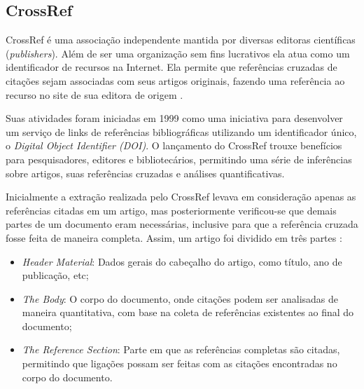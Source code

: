 

    

\subsection{CrossRef}
\label{ssec:crossref}

CrossRef é uma associação independente mantida por diversas editoras científicas (\emph{publishers}). Além de ser uma organização sem fins lucrativos ela atua como um identificador de recursos na Internet. Ela permite que referências cruzadas de citações sejam associadas com seus artigos originais, fazendo uma referência ao recurso no site de sua editora de origem \cite{Bergmark:2000:AER:867169}.

Suas atividades foram iniciadas em 1999 como uma iniciativa para desenvolver um serviço de links de referências bibliográficas utilizando um identificador único, o \emph{Digital Object Identifier (DOI)}. O lançamento do CrossRef trouxe benefícios para pesquisadores, editores e bibliotecários, permitindo uma série de inferências sobre artigos, suas referências cruzadas e análises quantificativas.

Inicialmente a extração realizada pelo CrossRef levava em consideração apenas as referências citadas em um artigo, mas posteriormente verificou-se que demais partes de um documento eram necessárias, inclusive para que a referência cruzada fosse feita de maneira completa. Assim, um artigo foi dividido em três partes \cite{Bergmark:2000:AER:867169}:

\begin{itemize}
    \item \emph{Header Material}: Dados gerais do cabeçalho do artigo, como título, ano de publicação, etc;
    \item \emph{The Body}: O corpo do documento, onde citações podem ser analisadas de maneira quantitativa, com base na coleta de referências existentes ao final do documento;
    \item \emph{The Reference Section}: Parte em que as referências completas são citadas, permitindo que ligações possam ser feitas com as citações encontradas no corpo do documento.
\end{itemize}

